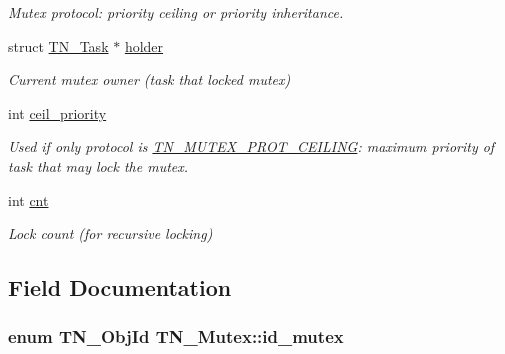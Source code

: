 \begin{DoxyCompactItemize}
\begin{DoxyCompactList}\small\item\em Mutex protocol\+: priority ceiling or priority inheritance. \end{DoxyCompactList}\item 
\hypertarget{structTN__Mutex_ae182682fa0d571716d03ce13e667254c}{struct \hyperlink{structTN__Task}{T\+N\+\_\+\+Task} $\ast$ \hyperlink{structTN__Mutex_ae182682fa0d571716d03ce13e667254c}{holder}}\label{structTN__Mutex_ae182682fa0d571716d03ce13e667254c}

\begin{DoxyCompactList}\small\item\em Current mutex owner (task that locked mutex) \end{DoxyCompactList}\item 
\hypertarget{structTN__Mutex_a98bfc437aae2a8841fd5538f2b0c2618}{int \hyperlink{structTN__Mutex_a98bfc437aae2a8841fd5538f2b0c2618}{ceil\+\_\+priority}}\label{structTN__Mutex_a98bfc437aae2a8841fd5538f2b0c2618}

\begin{DoxyCompactList}\small\item\em Used if only protocol is {\ttfamily \hyperlink{tn__mutex_8h_a11357f7bb31a3b380cbe94e0913a5b40a8edebcfa37593a4d2d541954ce3aea67}{T\+N\+\_\+\+M\+U\+T\+E\+X\+\_\+\+P\+R\+O\+T\+\_\+\+C\+E\+I\+L\+I\+N\+G}}\+: maximum priority of task that may lock the mutex. \end{DoxyCompactList}\item 
\hypertarget{structTN__Mutex_a7c367d7a5c5d8a640fd00b1fe4c9d461}{int \hyperlink{structTN__Mutex_a7c367d7a5c5d8a640fd00b1fe4c9d461}{cnt}}\label{structTN__Mutex_a7c367d7a5c5d8a640fd00b1fe4c9d461}

\begin{DoxyCompactList}\small\item\em Lock count (for recursive locking) \end{DoxyCompactList}\end{DoxyCompactItemize}


\subsection{Field Documentation}
\hypertarget{structTN__Mutex_a09b2fb7b45cab984dd3db1c9d1d3b5b4}{
\subsubsection[{id\+\_\+mutex}]{\setlength{\rightskip}{0pt plus 5cm}enum {\bf T\+N\+\_\+\+Obj\+Id} T\+N\+\_\+\+Mutex\+::id\+\_\+mutex}}\label{structTN__Mutex_a09b2fb7b45cab984dd3db1c9d1d3b5b4}



